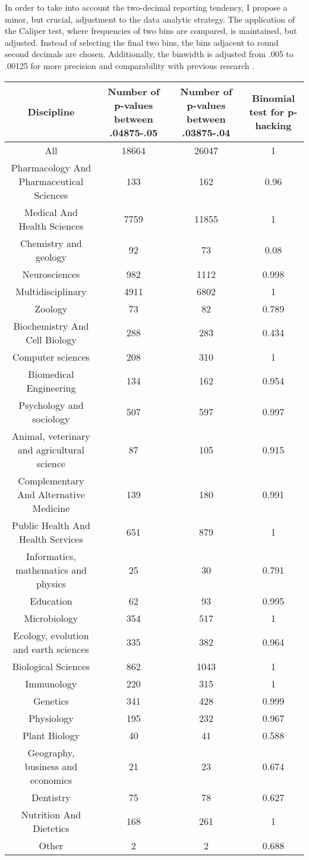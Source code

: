 In order to take into account the two-decimal reporting tendency, I propose a minor, but crucial, adjustment to the data analytic strategy. The application of the Caliper test, where frequencies of two bins are compared, is maintained, but adjusted. Instead of selecting the final two bins, the bins adjacent to round second decimals are chosen. Additionally, the binwidth is adjusted from .005 to .00125 for more precision and comparability with previous research \cite{Masicampo2012, Leggett2013}.

\begin{tabular}{ c c c c }
     Discipline & Number of p-values between .04875-.05 & Number of p-values between .03875-.04 & Binomial test for p-hacking \\
     \hline
    All   & 18664 & 26047 & 1 \\
    Pharmacology And Pharmaceutical Sciences & 133   & 162   & 0.96 \\
    Medical And Health Sciences & 7759  & 11855 & 1 \\
    Chemistry and geology & 92    & 73    & 0.08 \\
    Neurosciences & 982   & 1112  & 0.998 \\
    Multidisciplinary & 4911  & 6802  & 1 \\
    Zoology & 73    & 82    & 0.789 \\
    Biochemistry And Cell Biology & 288   & 283   & 0.434 \\
    Computer sciences & 208   & 310   & 1 \\
    Biomedical Engineering & 134   & 162   & 0.954 \\
    Psychology and sociology & 507   & 597   & 0.997 \\
    Animal, veterinary and agricultural science & 87    & 105   & 0.915 \\
    Complementary And Alternative Medicine & 139   & 180   & 0.991 \\
    Public Health And Health Services & 651   & 879   & 1 \\
    Informatics, mathematics and physics & 25    & 30    & 0.791 \\
    Education & 62    & 93    & 0.995 \\
    Microbiology & 354   & 517   & 1 \\
    Ecology, evolution and earth sciences & 335   & 382   & 0.964 \\
    Biological Sciences & 862   & 1043  & 1 \\
    Immunology & 220   & 315   & 1 \\
    Genetics & 341   & 428   & 0.999 \\
    Physiology & 195   & 232   & 0.967 \\
    Plant Biology & 40    & 41    & 0.588 \\
    Geography, business and economics & 21    & 23    & 0.674 \\
    Dentistry & 75    & 78    & 0.627 \\
    Nutrition And Dietetics & 168   & 261   & 1 \\
    Other & 2     & 2     & 0.688 \\
\end{tabular}